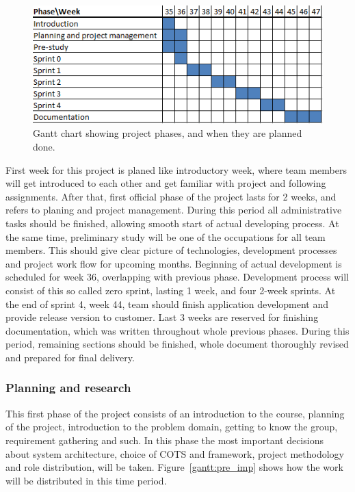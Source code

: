 \begin{figure}[h]
\centering
  \includegraphics[width=1.0\textwidth]{project_management/project_effort_estimation}
  \caption[Gantt chart of project phases]{Gantt chart showing project phases, and when they are planned done.}
  \label{gantt:project}
\end{figure}
First week for this project is planed like introductory week, where team members will get introduced to each other and get familiar with project and following assignments.\newline
After that, first official phase of the project lasts for 2 weeks, and refers to planing and project management. During this period all administrative tasks should be finished, allowing smooth start of actual developing process. At the same time, preliminary study will be one of the occupations for all team members. This should give clear picture of technologies, development processes and project work flow for upcoming months.\newline
Beginning of actual development is scheduled for week 36, overlapping with previous phase. Development process will consist of this so called zero sprint, lasting 1 week, and four 2-week sprints. At the end of sprint 4, week 44, team should finish application development and provide release version to customer.\newline
Last 3 weeks are reserved for finishing documentation, which was written throughout whole previous phases. During this period, remaining sections should be finished, whole document thoroughly revised and prepared for final delivery.\newline

\subsubsection{Planning and research}

This first phase of the project consists of an introduction to the course,
planning of the project, introduction to the problem domain, getting to know
the group, requirement gathering and such. In this phase the most important
decisions about system architecture, choice of COTS and framework, project
methodology and role distribution, will be taken. Figure~\ref{gantt:pre_imp}
shows how the work will be distributed in this time period.

